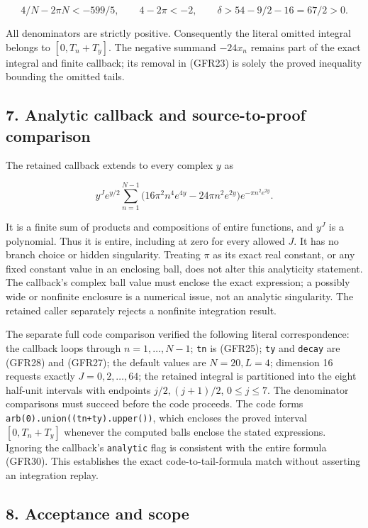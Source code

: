 \[
4/N-2\pi N<-599/5,\qquad
4-2\pi<-2,\qquad
\delta>54-9/2-16=67/2>0.
\tag{GFR29}
\]

All denominators are strictly positive. Consequently the literal omitted integral belongs to \([0,T_n+T_y]\). The negative summand \(-24x_n\) remains part of the exact integral and finite callback; its removal in (GFR23) is solely the proved inequality bounding the omitted tails.

\subsection{7. Analytic callback and source-to-proof comparison}\label{C47stage:GFR:analytic-callback-and-source-to-proof-comparison}

The retained callback extends to every complex \(y\) as

\[
y^Je^{y/2}\sum_{n=1}^{N-1}
\bigl(16\pi^2n^4e^{4y}-24\pi n^2e^{2y}\bigr)
 e^{-\pi n^2e^{2y}}.
\tag{GFR30}
\]

It is a finite sum of products and compositions of entire functions, and \(y^J\) is a polynomial. Thus it is entire, including at zero for every allowed \(J\). It has no branch choice or hidden singularity. Treating \(\pi\) as its exact real constant, or any fixed constant value in an enclosing ball, does not alter this analyticity statement. The callback's complex ball value must enclose the exact expression; a possibly wide or nonfinite enclosure is a numerical issue, not an analytic singularity. The retained caller separately rejects a nonfinite integration result.

The separate full code comparison verified the following literal correspondence: the callback loops through \(n=1,\ldots,N-1\); \nolinkurl{tn} is (GFR25); \nolinkurl{ty} and \nolinkurl{decay} are (GFR28) and (GFR27); the default values are \(N=20,L=4\); dimension 16 requests exactly \(J=0,2,\ldots,64\); the retained integral is partitioned into the eight half-unit intervals with endpoints \(j/2,(j+1)/2\), \(0\le j\le7\). The denominator comparisons must succeed before the code proceeds. The code forms \passthrough{\lstinline!arb(0).union((tn+ty).upper())!}, which encloses the proved interval \([0,T_n+T_y]\) whenever the computed balls enclose the stated expressions. Ignoring the callback's \nolinkurl{analytic} flag is consistent with the entire formula (GFR30). This establishes the exact code-to-tail-formula match without asserting an integration replay.

\subsection{8. Acceptance and scope}\label{C47stage:GFR:acceptance-and-scope}

